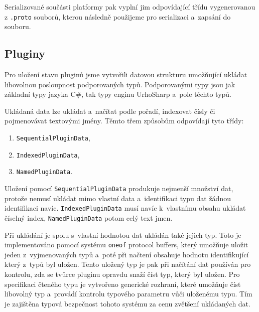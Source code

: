 Serializované součásti platformy pak vyplní jim odpovídající třídu vygenerovanou z \texttt{.proto} souborů, kterou následně použijeme pro serializaci a~zapsání do souboru.

\subsection{Pluginy}
Pro uložení stavu pluginů jsme vytvořili datovou strukturu umožňující ukládat libovolnou posloupnost podporovaných typů. Podporovanými typy jsou jak základní typy jazyka C\#, tak typy enginu UrhoSharp a~pole těchto typů.

Ukládaná data lze ukládat a~načítat podle pořadí, indexovat čísly či pojmenovávat textovými jmény. Těmto třem způsobům odpovídají tyto třídy:
\begin{enumerate}
	\item \texttt{SequentialPluginData},
	\item \texttt{IndexedPluginData},
	\item \texttt{NamedPluginData}.
\end{enumerate}

Uložení pomocí \texttt{SequentialPluginData} produkuje nejmenší množství dat, protože nemusí ukládat mimo vlastní data a~identifikaci typu dat žádnou identifikaci navíc. \texttt{IndexedPluginData} musí navíc k~vlastnímu obsahu ukládat číselný index, \texttt{NamedPluginData} potom celý text jmen.

Při ukládání je spolu s~vlastní hodnotou dat ukládán také jejich typ. Toto je implementováno pomocí systému \texttt{oneof} protocol buffers, který umožňuje uložit jeden z~vyjmenovaných typů a~poté při načtení obsahuje hodnotu identifikující který z~typů byl uložen. Tento uložený typ je pak při načítání dat používán pro kontrolu, zda se tvůrce pluginu opravdu snaží číst typ, který byl uložen. Pro specifikaci čteného typu je vytvořeno generické rozhraní, které umožňuje číst libovolný typ a~provádí kontrolu typového parametru vůči uloženému typu. Tím je zajištěna typová bezpečnost tohoto systému za cenu zvětšení ukládaných dat.


